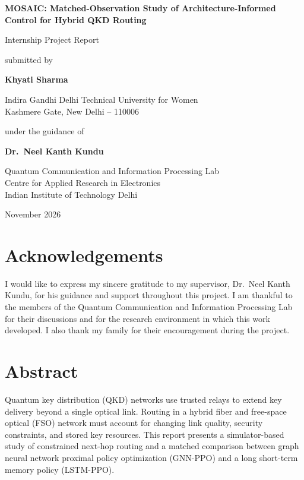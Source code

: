 \documentclass[12pt,a4paper,oneside]{report}
\begin{document}
\begin{titlepage}
\centering
\vspace*{1.2cm}
{\Large\bfseries MOSAIC: Matched-Observation Study of Architecture-Informed Control for Hybrid QKD Routing\par}
\vspace{1.8cm}
{\large Internship Project Report\par}
\vspace{1.0cm}
{\large submitted by\par}
\vspace{0.35cm}
{\Large\bfseries Khyati Sharma\par}
{\large Indira Gandhi Delhi Technical University for Women\\
Kashmere Gate, New Delhi -- 110006\par}
\vspace{1.1cm}
{\large under the guidance of\par}
\vspace{0.35cm}
{\Large\bfseries Dr.\ Neel Kanth Kundu\par}
\vfill
{\large Quantum Communication and Information Processing Lab\\
Centre for Applied Research in Electronics\\
Indian Institute of Technology Delhi\par}
\vspace{0.6cm}
{\large November 2026\par}
\end{titlepage}

\chapter*{Acknowledgements}
I would like to express my sincere gratitude to my supervisor, Dr.\ Neel Kanth Kundu, for his guidance and support throughout this project. I am thankful to the members of the Quantum Communication and Information Processing Lab for their discussions and for the research environment in which this work developed. I also thank my family for their encouragement during the project.

\chapter*{Abstract}
Quantum key distribution (QKD) networks use trusted relays to extend key delivery beyond a single optical link. Routing in a hybrid fiber and free-space optical (FSO) network must account for changing link quality, security constraints, and stored key resources. This report presents a simulator-based study of constrained next-hop routing and a matched comparison between graph neural network proximal policy optimization (GNN-PPO) and a long short-term memory policy (LSTM-PPO).
\end{document}

